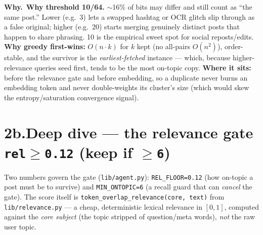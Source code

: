 \documentclass[11pt,a4paper]{article}
\newcommand{\why}[1]{%
  \par\vspace{2pt}%
  \noindent\colorbox{mist}{\begin{minipage}{\dimexpr\linewidth-2\fboxsep}%
  \textcolor{accent2}{\textbf{Why.}}~#1\end{minipage}}\par\vspace{3pt}}
\newcommand{\code}[1]{\texttt{\small #1}}
\begin{document}
\begin{center}
\end{center}

\why{\textbf{Why threshold 10/64.} $\sim$16\% of bits may differ and still count as ``the same
post.'' Lower (e.g.\ 3) lets a swapped hashtag or OCR glitch slip through as a false original;
higher (e.g.\ 20) starts merging genuinely distinct posts that happen to share phrasing. 10 is
the empirical sweet spot for social reposts/edits. \textbf{Why greedy first-wins:}
$O(n\!\cdot\!k)$ for $k$ kept (no all-pairs $O(n^2)$), order-stable, and the survivor is the
\emph{earliest-fetched} instance --- which, because higher-relevance queries seed first, tends
to be the most on-topic copy. \textbf{Where it sits:} before the relevance gate and before
embedding, so a duplicate never burns an embedding token and never double-weights its cluster's
size (which would skew the entropy/saturation convergence signal).}

\section*{2b.\quad Deep dive --- the relevance gate \code{rel}$\ge$\code{0.12} (keep if $\ge$\code{6})}

Two numbers govern the gate (\code{lib/agent.py}): \code{REL\_FLOOR=0.12} (how on-topic a post
must be to survive) and \code{MIN\_ONTOPIC=6} (a recall guard that can \emph{cancel} the gate).
The score itself is \code{token\_overlap\_relevance(core, text)} from \code{lib/relevance.py} ---
a cheap, deterministic lexical relevance in $[0,1]$, computed against the \emph{core subject}
(the topic stripped of question/meta words), \emph{not} the raw user topic.
\end{document}
